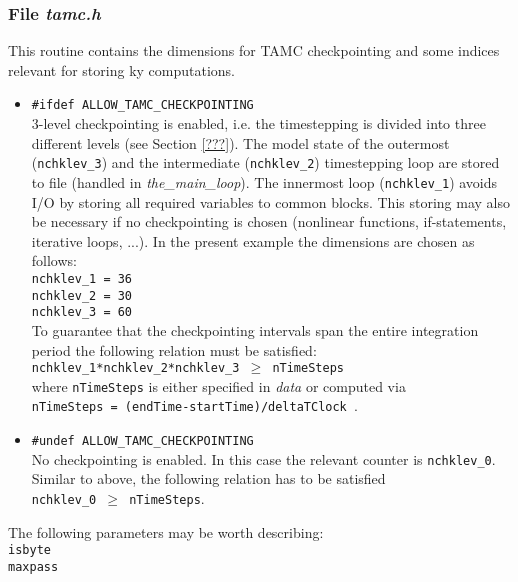 \subsubsection{File {\it tamc.h}}

This routine contains the dimensions for TAMC checkpointing
and some indices relevant for storing ky computations.
%
\begin{itemize}
%
\item {\tt \#ifdef ALLOW\_TAMC\_CHECKPOINTING} \\
3-level checkpointing is enabled, i.e. the timestepping
is divided into three different levels (see Section \ref{???}).
The model state of the outermost ({\tt nchklev\_3}) and the
intermediate ({\tt nchklev\_2}) timestepping loop are stored to file
(handled in {\it the\_main\_loop}).
The innermost loop ({\tt nchklev\_1}) 
avoids I/O by storing all required variables
to common blocks. This storing may also be necessary if
no checkpointing is chosen
(nonlinear functions, if-statements, iterative loops, ...).
In the present example the dimensions are chosen as follows: \\
\hspace*{4ex} {\tt nchklev\_1      =  36 } \\
\hspace*{4ex} {\tt nchklev\_2      =  30 } \\
\hspace*{4ex} {\tt nchklev\_3      =  60 } \\
To guarantee that the checkpointing intervals span the entire
integration period the following relation must be satisfied: \\
\hspace*{4ex} {\tt nchklev\_1*nchklev\_2*nchklev\_3 $ \ge $ nTimeSteps} \\
where {\tt nTimeSteps} is either specified in {\it data}
or computed via \\
\hspace*{4ex} {\tt nTimeSteps = (endTime-startTime)/deltaTClock }. 
%
\item {\tt \#undef ALLOW\_TAMC\_CHECKPOINTING} \\
No checkpointing is enabled.
In this case the relevant counter is {\tt nchklev\_0}.
Similar to above, the following relation has to be satisfied \\
\hspace*{4ex} {\tt nchklev\_0 $ \ge $ nTimeSteps}.
%
\end{itemize}

The following parameters may be worth describing: \\
%
\hspace*{4ex} {\tt isbyte} \\
\hspace*{4ex} {\tt maxpass} \\
~
 
